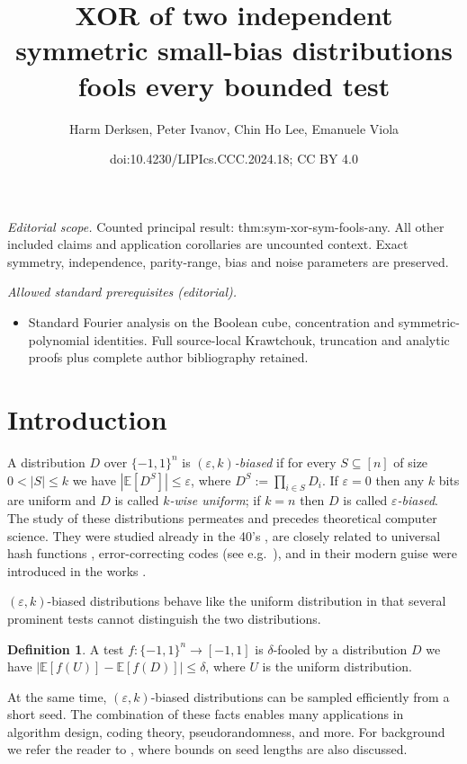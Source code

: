 \documentclass[10pt,a4paper]{article}
\title{XOR of two independent symmetric small-bias distributions fools every bounded test}
\author{Harm Derksen, Peter Ivanov, Chin Ho Lee, Emanuele Viola}
\date{doi:10.4230/LIPIcs.CCC.2024.18; CC BY 4.0}
\theoremstyle{definition}
\newtheorem{definition}[theorem]{Definition}
\newcommand{\eps}{\epsilon}
\newcommand{\pmo}{\{-1,1\}}
\def\epsilon{\varepsilon}
\begin{document}
\maketitle
\noindent\textit{Editorial scope.} Counted principal result: thm:sym-xor-sym-fools-any. All other included claims and application corollaries are uncounted context. Exact symmetry, independence, parity-range, bias and noise parameters are preserved.\par\medskip
\noindent\textit{Allowed standard prerequisites (editorial).}\begin{itemize}
\item Standard Fourier analysis on the Boolean cube, concentration and symmetric-polynomial identities. Full source-local Krawtchouk, truncation and analytic proofs plus complete author bibliography retained.
\end{itemize}\medskip
\section{Introduction}
A distribution $D$ over $\{-1,1\}^n$ is \emph{$(\eps,k)$-biased} if for every $S \subseteq [n]$ of size $0 < |S| \le k$ we have $|\mathbb{E}[D^S]| \le \eps$, where $D^S := \prod_{i\in S} D_i$.  If $\eps = 0$ then any $k$ bits are uniform and $D$ is called \emph{$k$-wise uniform}; if $k = n$ then $D$ is called \emph{$\eps$-biased}.  The study of these distributions permeates and precedes theoretical computer science.  They were studied already in the 40's \cite{MR22821}, are closely related to universal hash functions \cite{CaW79}, error-correcting codes (see e.g.~\cite{DBLP:journals/eccc/HatamiH23}), and in their modern guise were introduced in the works \cite{ABI86,ChorGoHaFrRuSm85,NaN90}.

$(\eps,k)$-biased distributions behave like the uniform distribution in that several prominent tests cannot distinguish the two distributions.


\begin{definition} A test $f\colon \pmo^n \to [-1,1]$ is $\delta$-fooled by a distribution $D$ we have $|\mathbb{E}[f(U)] - \mathbb{E}[f(D)]|\le \delta$, where $U$ is the uniform distribution.
\end{definition}

At the same time, $(\eps,k)$-biased distributions can be sampled efficiently from a short seed. The combination of these facts enables many applications in algorithm design, coding theory, pseudorandomness, and more. For background we refer the reader to \cite{Vadhan12,DBLP:journals/eccc/HatamiH23,moti}, where bounds on seed lengths are also discussed.
\end{document}
